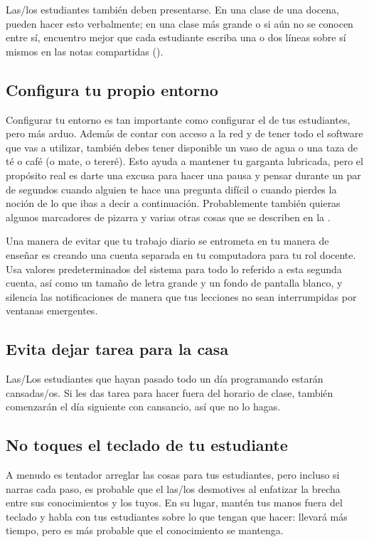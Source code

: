 Las/los estudiantes también deben presentarse.
En una clase de una docena,
pueden hacer esto verbalmente;
en una clase más grande o si aún no se conocen entre sí,
encuentro mejor que cada estudiante escriba una o dos líneas sobre sí mismos en las notas compartidas ().

\subsection*{Configura tu propio entorno}

Configurar tu entorno es tan importante como configurar el de tus estudiantes,
pero más arduo.
Además de contar con acceso a la red y de tener todo el software que vas a utilizar,
también debes tener disponible un vaso de agua
o una taza de té o café (o mate, o tereré).
Esto ayuda a mantener tu garganta lubricada,
pero el propósito real es darte una excusa para hacer una pausa y pensar durante un par de segundos
cuando alguien te hace una pregunta difícil
o cuando pierdes la noción de lo que ibas a decir a continuación.
Probablemente también quieras algunos marcadores de pizarra
y varias otras cosas que se describen en la .

Una manera de evitar que tu trabajo diario se entrometa en tu manera de enseñar
es creando una cuenta separada en tu computadora para tu rol docente.
Usa valores predeterminados del sistema para todo lo referido a esta segunda cuenta, 
así como un tamaño de letra grande y un fondo de pantalla blanco,
y silencia las notificaciones de manera que tus lecciones no sean interrumpidas por 
ventanas emergentes.

\subsection*{Evita dejar tarea para la casa}

Las/Los estudiantes que hayan pasado todo un día programando estarán cansadas/os.
Si les das tarea para hacer fuera del horario de clase,
también comenzarán el día siguiente con cansancio,
así que no lo hagas.

\subsection*{No toques el teclado de tu estudiante}

A menudo es tentador arreglar las cosas para tus estudiantes,
pero incluso si narras cada paso,
es probable que el las/los desmotives
al enfatizar la brecha entre sus conocimientos y los tuyos.
En su lugar,
mantén tus manos fuera del teclado y habla con tus estudiantes sobre lo que tengan que hacer:
llevará más tiempo,
pero es más probable que el conocimiento se mantenga.

